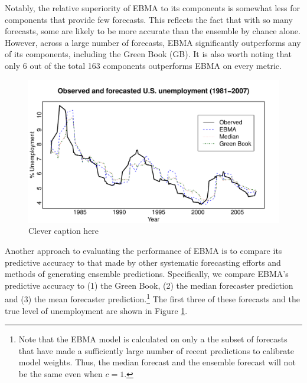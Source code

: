 \documentclass[12pt,fullpage,endnotes]{article}
\begin{document}
Notably, the relative superiority of EBMA to its components is
somewhat less for components that provide few forecasts.  This
reflects the fact that with so many forecasts, some are likely to be
more accurate than the ensemble by chance alone. However, across a
large number of forecasts, EBMA significantly outperforms any of its
components, including the Green Book (GB).  It is also worth noting
that only 6 out of the total 163 components outperforms EBMA on every
metric.

\begin{figure}[h]
\caption{Clever caption here}
\label{timeSeries}
\begin{center}
\includegraphics[scale=.8]{timeSeries}
\end{center}
\end{figure}


Another approach to evaluating the performance of EBMA is to compare
its predictive accuracy to that made by other systematic forecasting
efforts and methods of generating ensemble predictions.  Specifically,
we compare EBMA's predictive accuracy to (1) the Green Book, (2) the
median forecaster prediction and (3) the mean forecaster
prediction.\footnote{Note that the EBMA model is calculated on only a the
  subset of forecasts that have made a sufficiently large number of
  recent predictions to calibrate model weights.  Thus, the median
  forecast and the ensemble forecast will not be the same even when
  $c=1$.  }  The first three of these forecasts and the true level of
unemployment are shown in Figure \ref{timeSeries}.
\end{document}

